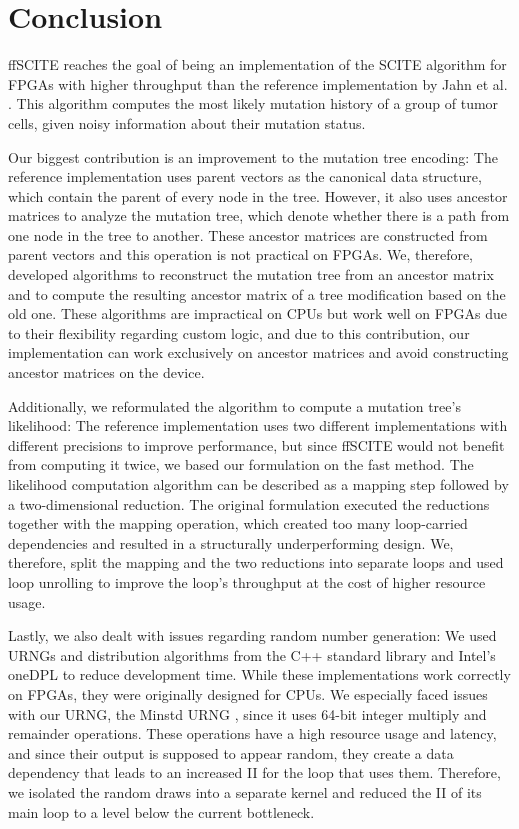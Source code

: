 \chapter{Conclusion}
\label{ch:conclusion}

\ac{ffSCITE} reaches the goal of being an implementation of the \ac{SCITE} algorithm for \acp{FPGA} with higher throughput than the reference implementation by Jahn et al. \cite{tree2016}. This algorithm computes the most likely mutation history of a group of tumor cells, given noisy information about their mutation status.

Our biggest contribution is an improvement to the mutation tree encoding: The reference implementation uses parent vectors as the canonical data structure, which contain the parent of every node in the tree. However, it also uses ancestor matrices to analyze the mutation tree, which denote whether there is a path from one node in the tree to another. These ancestor matrices are constructed from parent vectors and this operation is not practical on \acp{FPGA}. We, therefore, developed algorithms to reconstruct the mutation tree from an ancestor matrix and to compute the resulting ancestor matrix of a tree modification based on the old one. These algorithms are impractical on \acp{CPU} but work well on \acp{FPGA} due to their flexibility regarding custom logic, and due to this contribution, our implementation can work exclusively on ancestor matrices and avoid constructing ancestor matrices on the device.

Additionally, we reformulated the algorithm to compute a mutation tree's likelihood: The reference implementation uses two different implementations with different precisions to improve performance, but since \ac{ffSCITE} would not benefit from computing it twice, we based our formulation on the fast method. The likelihood computation algorithm can be described as a mapping step followed by a two-dimensional reduction. The original formulation executed the reductions together with the mapping operation, which created too many loop-carried dependencies and resulted in a structurally underperforming design. We, therefore, split the mapping and the two reductions into separate loops and used loop unrolling to improve the loop's throughput at the cost of higher resource usage.

Lastly, we also dealt with issues regarding random number generation: We used \acfp{URNG} and distribution algorithms from the C++ standard library and Intel's oneDPL to reduce development time. While these implementations work correctly on \acp{FPGA}, they were originally designed for \acp{CPU}. We especially faced issues with our \ac{URNG}, the Minstd \ac{URNG} \cite{park1988random}, since it uses 64-bit integer multiply and remainder operations. These operations have a high resource usage and latency, and since their output is supposed to appear random, they create a data dependency that leads to an increased \acf{II} for the loop that uses them. Therefore, we isolated the random draws into a separate kernel and reduced the \ac{II} of its main loop to a level below the current bottleneck.

